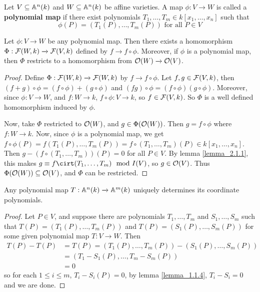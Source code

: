 \begin{definition}
  Let $V \subseteq \mathbb{A}^n(k)$ and $W \subseteq \mathbb{A}^n(k)$ be affine varieties. A map
  $\phi:V \xrightarrow{} W$ is called a \textbf{polynomial map} if there exist
  polynomials $T_1, \dots, T_m \in k[x_1, \dots, x_n]$ such that
  \begin{equation*}
    \phi(P)=(T_1(P), \dots, T_m(P)) \text{ for all } P \in V
  \end{equation*}
\end{definition}

\begin{lemma}\label{lemma_2.1.2}
  Let $\phi:V \xrightarrow{} W$ be any polynomial map. Then there exists a
  homomorphism $\Phi:\mathcal{F}(W,k) \xrightarrow{} \mathcal{F}(V,k)$ defined by $f
  \xrightarrow{} f \circ \phi$. Moreover, if $\phi$ is a polynomial map, then
  $\Phi$ restricts to a homomorphism from  $\mathcal{O}(W) \xrightarrow{} \mathcal{O}(V)$.
\end{lemma}
\begin{proof}
  Define $\Phi:\mathcal{F}(W,k) \xrightarrow{} \mathcal{F}(W,k)$ by $f \xrightarrow{} f \circ
  \phi$. Let $f,g \in \mathcal{F}(V,k)$, then $(f+g) \circ \phi=(f \circ \phi)+(g \circ
  \phi)$ and $(fg) \circ \phi=(f \circ \phi)(g \circ \phi)$. Moreover, since
  $\phi:V \xrightarrow{} W$, and $f:W \xrightarrow{} k$, $f \circ \phi: V
  \xrightarrow{} k$, so $f \in \mathcal{F}(V,k)$. So $\Phi$ is a well defined
  homomorphism induced by $\phi$.

  Now, take $\Phi$ restricted to $\mathcal{O}(W)$, and $g \in \Phi(\mathcal{O}(W))$. Then $g=f
  \circ \phi$ where $f:W \xrightarrow{} k$. Now, since $\phi$ is a polynomial
  map, we get $f \circ \phi(P)=f(T_1(P), \dots, T_m(P))=f \circ (T_1, \dots,
  T_m)(P) \in k[x_1, \dots, x_n]$. Then $g-(f \circ (T_1, \dots, T_m))(P)=0$ for
  all $P \in V$. By lemma \ref{lemma_2.1.1}, this makes $g \equiv f \cirt (T_1,
  \dots, T_m) \mod{I(V)}$, so $g \in \mathcal{O}(V)$. Thus $\Phi(\mathcal{O}(W)) \subseteq
  \mathcal{O}(V)$, and $\Phi$ can be restricted.
\end{proof}

\begin{lemma}\label{lemma_2.1.3}
  Any polynomial map $T:\mathbb{A}^n(k) \xrightarrow{} \mathbb{A}^m(k)$ uniquely determines its
  coordinate polynomials.
\end{lemma}
\begin{proof}
  Let $P \in V$, and suppose there are polynomials $T_1, \dots, T_m$ and $S_1,
  \dots, S_m$ such that $T(P)=(T_1(P), \dots, T_m(P))$ and
  $T(P)=(S_1(P), \dots, S_m(P))$ for some given polynomial map
  $T:V \xrightarrow{} W$. Then
  \begin{align*}
    T(P)-T(P) &= T(P)=(T_1(P), \dots, T_m(P))-(S_1(P), \dots, S_m(P)) \\
        &=  (T_1-S_1(P), \dots, T_m-S_m(P))  \\
        &=  0
  \end{align*}
  so for each $1 \leq i \leq m$, $T_i-S_i(P)=0$, by lemma \ref{lemma_1.1.4},
  $T_i-S_i=0$ and we are done.
\end{proof}

